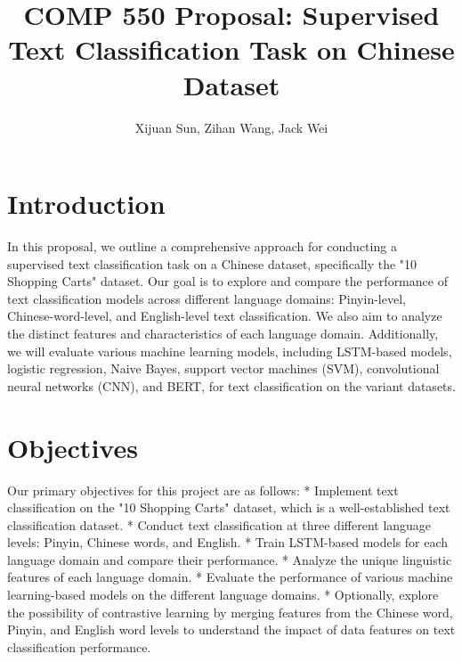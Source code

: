 \documentclass[12pt, a4paper]{extarticle}
\title{COMP 550 Proposal: Supervised Text Classification Task on Chinese Dataset}
\author{Xijuan Sun, Zihan Wang, Jack Wei}
\date{}
\begin{document}
\maketitle 

\section{Introduction}

In this proposal, we outline a comprehensive approach for conducting a supervised text classification task on a Chinese dataset, specifically the "10 Shopping Carts" dataset. Our goal is to explore and compare the performance of text classification models across different language domains: Pinyin-level, Chinese-word-level, and English-level text classification. We also aim to analyze the distinct features and characteristics of each language domain. Additionally, we will evaluate various machine learning models, including LSTM-based models, logistic regression, Naive Bayes, support vector machines (SVM), convolutional neural networks (CNN), and BERT, for text classification on the variant datasets.

\section{Objectives}
Our primary objectives for this project are as follows:
* Implement text classification on the "10 Shopping Carts" dataset, which is a well-established text classification dataset.
* Conduct text classification at three different language levels: Pinyin, Chinese words, and English.
* Train LSTM-based models for each language domain and compare their performance.
* Analyze the unique linguistic features of each language domain.
* Evaluate the performance of various machine learning-based models on the different language domains.
* Optionally, explore the possibility of contrastive learning by merging features from the Chinese word, Pinyin, and English word levels to understand the impact of data features on text classification performance.
\end{document}
